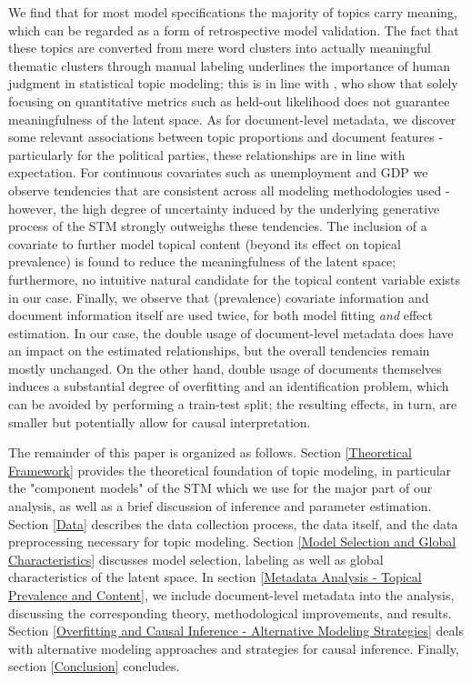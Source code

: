 We find that for most model specifications the majority of topics carry meaning, which can be regarded as a form of retrospective model validation. The fact that these topics are converted from mere word clusters into actually meaningful thematic clusters through manual labeling underlines the importance of human judgment in statistical topic modeling; this is in line with \cite{chang2009reading}, who show that solely focusing on quantitative metrics such as held-out likelihood does not guarantee meaningfulness of the latent space. As for document-level metadata, we discover some relevant associations between topic proportions and document features - particularly for the political parties, these relationships are in line with expectation. For continuous covariates such as unemployment and GDP we observe tendencies that are consistent across all modeling methodologies used - however, the high degree of uncertainty induced by the underlying generative process of the STM strongly outweighs these tendencies. The inclusion of a covariate to further model topical content (beyond its effect on topical prevalence) is found to reduce the meaningfulness of the latent space; furthermore, no intuitive natural candidate for the topical content variable exists in our case. Finally, we observe that (prevalence) covariate information and document information itself are used twice, for both model fitting \textit{and} effect estimation. In our case, the double usage of document-level metadata does have an impact on the estimated relationships, but the overall tendencies remain mostly unchanged. On the other hand, double usage of documents themselves induces a substantial degree of overfitting and an identification problem, which can be avoided by performing a train-test split; the resulting effects, in turn, are smaller but potentially allow for causal interpretation.

The remainder of this paper is organized as follows. Section \ref{Theoretical Framework} provides the theoretical foundation of topic modeling, in particular the "component models" of the STM which we use for the major part of our analysis, as well as a brief discussion of inference and parameter estimation. Section \ref{Data} describes the data collection process, the data itself, and the data preprocessing necessary for topic modeling. Section \ref{Model Selection and Global Characteristics} discusses model selection, labeling as well as global characteristics of the latent space. In section \ref{Metadata Analysis - Topical Prevalence and Content}, we include document-level metadata into the analysis, discussing the corresponding theory, methodological improvements, and results. Section \ref{Overfitting and Causal Inference - Alternative Modeling Strategies} deals with alternative modeling approaches and strategies for causal inference. Finally, section \ref{Conclusion} concludes.